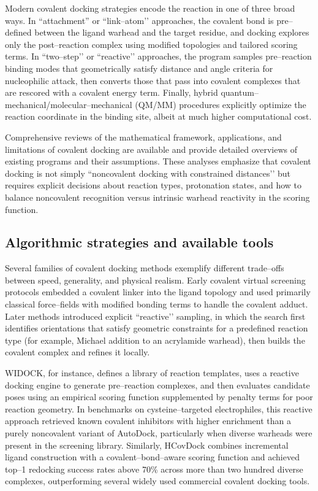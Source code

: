 \documentclass[12pt]{article}
\begin{document}
Modern covalent docking strategies encode the reaction in one of three broad ways.  
In “attachment” or “link–atom’’ approaches, the covalent bond is pre–defined between the ligand warhead and the target residue, and docking explores only the post–reaction complex using modified topologies and tailored scoring terms.  
In “two–step’’ or “reactive’’ approaches, the program samples pre–reaction binding modes that geometrically satisfy distance and angle criteria for nucleophilic attack, then converts those that pass into covalent complexes that are rescored with a covalent energy term.  
Finally, hybrid quantum–mechanical/molecular–mechanical (QM/MM) procedures explicitly optimize the reaction coordinate in the binding site, albeit at much higher computational cost.

Comprehensive reviews of the mathematical framework, applications, and limitations of covalent docking are available and provide detailed overviews of existing programs and their assumptions.\cite{CH14_CovalentDockingReview2015,CH14_CovalentToolSelection2019} 
These analyses emphasize that covalent docking is not simply “noncovalent docking with constrained distances’’ but requires explicit decisions about reaction types, protonation states, and how to balance noncovalent recognition versus intrinsic warhead reactivity in the scoring function.

\subsection{Algorithmic strategies and available tools}

Several families of covalent docking methods exemplify different trade–offs between speed, generality, and physical realism.  
Early covalent virtual screening protocols embedded a covalent linker into the ligand topology and used primarily classical force–fields with modified bonding terms to handle the covalent adduct.\cite{CH14_CovalentLargeLibraries2014}  
Later methods introduced explicit “reactive’’ sampling, in which the search first identifies orientations that satisfy geometric constraints for a predefined reaction type (for example, Michael addition to an acrylamide warhead), then builds the covalent complex and refines it locally.\cite{CH14_WIDOCK2021,CH14_HCovDock2023} 

WIDOCK, for instance, defines a library of reaction templates, uses a reactive docking engine to generate pre–reaction complexes, and then evaluates candidate poses using an empirical scoring function supplemented by penalty terms for poor reaction geometry. 
In benchmarks on cysteine–targeted electrophiles, this reactive approach retrieved known covalent inhibitors with higher enrichment than a purely noncovalent variant of AutoDock, particularly when diverse warheads were present in the screening library.\cite{CH14_WIDOCK2021} 
Similarly, HCovDock combines incremental ligand construction with a covalent–bond–aware scoring function and achieved top–1 redocking success rates above 70\% across more than two hundred diverse complexes, outperforming several widely used commercial covalent docking tools.\cite{CH14_HCovDock2023} 
\end{document}
